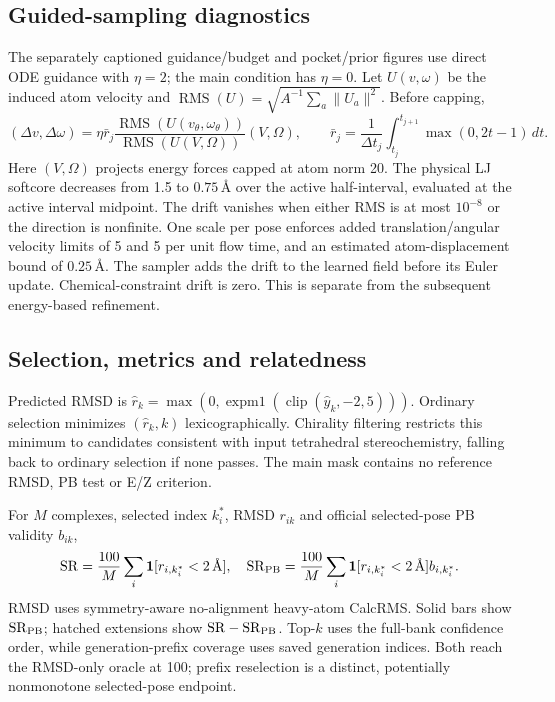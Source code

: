 \subsection{Guided-sampling diagnostics}
The separately captioned guidance/budget and pocket/prior figures use
direct ODE guidance with $\eta=2$; the main condition has $\eta=0$.
Let $U(v,\omega)$ be the induced atom velocity and
$\operatorname{RMS}(U)=\sqrt{A^{-1}\sum_a\|U_a\|^2}$. Before capping,
\begin{equation}
 (\Delta v,\Delta\omega)=\eta\bar r_j
 \frac{\operatorname{RMS}(U(v_\theta,\omega_\theta))}
 {\operatorname{RMS}(U(V,\Omega))}(V,\Omega),\qquad
 \bar r_j=\frac{1}{\Delta t_j}\int_{t_j}^{t_{j+1}}\max(0,2t-1)\,dt.
\end{equation}
Here $(V,\Omega)$ projects energy forces capped at atom norm 20. The physical
LJ softcore decreases from 1.5 to $0.75\,\text{\AA}$ over the active
half-interval, evaluated at the active interval midpoint. The drift vanishes
when either RMS is at most $10^{-8}$ or the direction is nonfinite.
One scale per pose enforces added translation/angular velocity limits of
5 and 5 per unit flow time, and an estimated atom-displacement bound of
$0.25\,\text{\AA}$. The sampler adds the drift to the learned field before
its Euler update. Chemical-constraint drift is zero. This is separate from
the subsequent energy-based refinement.

\subsection{Selection, metrics and relatedness}
Predicted RMSD is $\widehat r_k=\max(0,\operatorname{expm1}
(\operatorname{clip}(\widehat y_k,-2,5)))$. Ordinary selection minimizes
$(\widehat r_k,k)$ lexicographically. Chirality filtering restricts this
minimum to candidates consistent with input tetrahedral stereochemistry,
falling back to ordinary selection if none passes. The main mask contains no
reference RMSD, PB test or E/Z criterion.

For $M$ complexes, selected index $k_i^*$, RMSD $r_{ik}$ and official
selected-pose PB validity $b_{ik}$,
\begin{equation}
 \mathrm{SR}=\frac{100}{M}\sum_i\mathbf1[r_{i,k_i^*}<2\,\text{\AA}],\quad
 \mathrm{SR}_{\rm PB}=\frac{100}{M}\sum_i\mathbf1[r_{i,k_i^*}<2\,\text{\AA}]b_{i,k_i^*}.
\end{equation}
RMSD uses symmetry-aware no-alignment heavy-atom CalcRMS. Solid bars show
$\mathrm{SR}_{\rm PB}$; hatched extensions show $\mathrm{SR}-\mathrm{SR}_{\rm PB}$.
Top-$k$ uses the full-bank confidence order, while generation-prefix coverage
uses saved generation indices. Both reach the RMSD-only oracle at 100; prefix
reselection is a distinct, potentially nonmonotone selected-pose endpoint.

